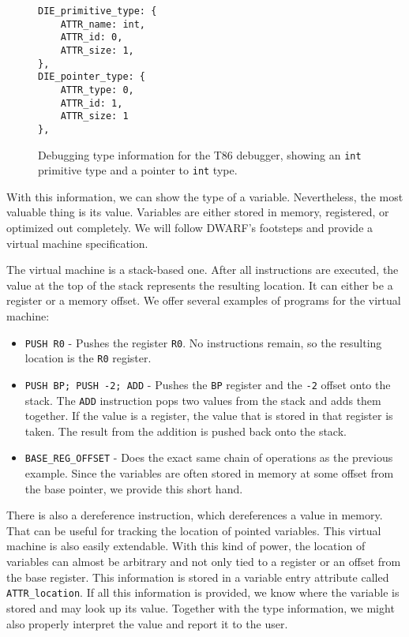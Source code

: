 \begin{figure}
    \begin{lstlisting}
DIE_primitive_type: {
    ATTR_name: int,
    ATTR_id: 0,
    ATTR_size: 1,
},
DIE_pointer_type: {
    ATTR_type: 0,
    ATTR_id: 1,
    ATTR_size: 1
},
    \end{lstlisting}
    \caption{Debugging type information for the T86 debugger, showing an
    \texttt{int} primitive type and a pointer to \texttt{int} type.}
    \label{fig:t86dbg-types}
\end{figure}

With this information, we can show the type of a variable. Nevertheless, the most valuable thing is its value. Variables are either stored in memory, registered, or optimized out completely. We will follow DWARF's footsteps and provide a virtual machine specification.

The virtual machine is a stack-based one. After all instructions are executed,
the value at the top of the stack represents the resulting location. It can
either be a register or a memory offset. We offer several examples of programs
for the virtual machine:
\begin{itemize}
    \item \texttt{PUSH R0} - Pushes the register \texttt{R0}. No instructions
        remain, so the resulting location is the \texttt{R0} register.
    \item \texttt{PUSH BP; PUSH -2; ADD} - Pushes the \texttt{BP} register and
        the \texttt{-2} offset onto the stack. The \texttt{ADD} instruction
        pops two values from the stack and adds them together. If the value is
        a register, the value that is stored in that register is taken. The
        result from the addition is pushed back onto the stack.
    \item \verb|BASE_REG_OFFSET| - Does the exact same chain of operations as
        the previous example. Since the variables are often stored in memory at
        some offset from the base pointer, we provide this short hand.
\end{itemize}

There is also a dereference instruction, which dereferences a value in memory.
That can be useful for tracking the location of pointed variables. This virtual
machine is also easily extendable. With this kind of power, the location of
variables can almost be arbitrary and not only tied to a register or an offset
from the base register. This information is stored in a variable entry
attribute called \texttt{ATTR\_location}. If all this information is provided,
we know where the variable is stored and may look up its value. Together with
the type information, we might also properly interpret the value and report it
to the user.

